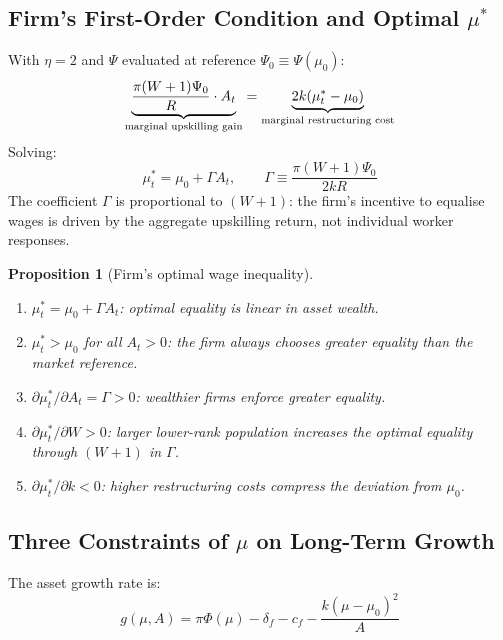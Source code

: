\documentclass[12pt,a4paper]{article}
\newtheorem{proposition}{Proposition}
\begin{document}
\subsection{Firm's First-Order Condition and Optimal $\mu^*$}

With $\eta = 2$ and $\Psi$ evaluated at reference $\Psi_0 \equiv
\Psi(\mu_0)$:
\begin{equation}
  \underbrace{\frac{\pi(W+1)\Psi_0}{R}\cdot A_t}_{%
    \text{marginal upskilling gain}}
  =
  \underbrace{2k(\mu_t^* - \mu_0)}_{%
    \text{marginal restructuring cost}}
  \label{eq:foc}
\end{equation}
Solving:
\begin{equation}
  \boxed{\mu_t^* = \mu_0 + \Gamma A_t,
  \qquad
  \Gamma \equiv \frac{\pi(W+1)\Psi_0}{2kR}}
  \label{eq:mu_opt}
\end{equation}
The coefficient $\Gamma$ is proportional to $(W+1)$: the firm's
incentive to equalise wages is driven by the aggregate upskilling
return, not individual worker responses.

\begin{proposition}[Firm's optimal wage inequality]
\label{prop:firm_mu}
\begin{enumerate}
  \item $\mu_t^* = \mu_0 + \Gamma A_t$: optimal equality is linear in
        asset wealth.
  \item $\mu_t^* > \mu_0$ for all $A_t > 0$: the firm always chooses
        greater equality than the market reference.
  \item $\partial\mu_t^*/\partial A_t = \Gamma > 0$: wealthier firms
        enforce greater equality.
  \item $\partial\mu_t^*/\partial W > 0$: larger lower-rank population
        increases the optimal equality through $(W+1)$ in $\Gamma$.
  \item $\partial\mu_t^*/\partial k < 0$: higher restructuring costs
        compress the deviation from $\mu_0$.
\end{enumerate}
\end{proposition}

\subsection{Three Constraints of $\mu$ on Long-Term Growth}

The asset growth rate is:
\begin{equation}
  g(\mu, A) = \pi\Phi(\mu) - \delta_f - c_f
              - \frac{k(\mu-\mu_0)^2}{A}
  \label{eq:growth_rate}
\end{equation}
\end{document}
